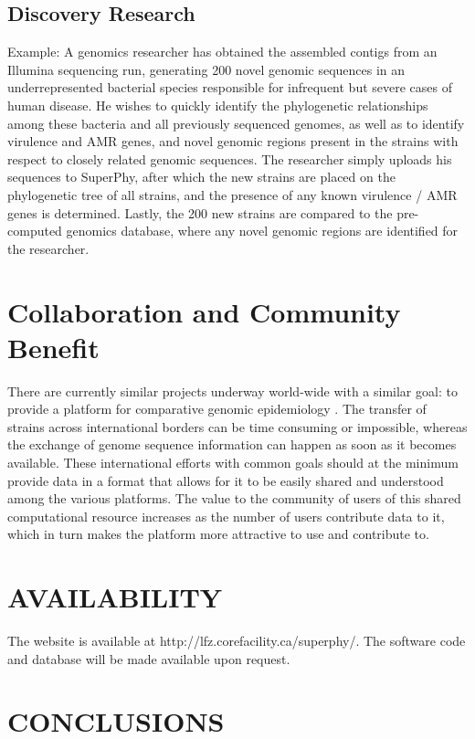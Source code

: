 \documentclass[a4paper,twoside]{article}
\begin{document}
\subsection{Discovery Research}
Example: A genomics researcher has obtained the assembled contigs from an Illumina sequencing run, generating 200 novel genomic sequences in an underrepresented bacterial species responsible for infrequent but severe cases of human disease. He wishes to quickly identify the phylogenetic relationships among these bacteria and all previously sequenced genomes, as well as to identify virulence and AMR genes, and novel genomic regions present in the strains with respect to closely related genomic sequences. The researcher simply uploads his sequences to SuperPhy, after which the new strains are placed on the phylogenetic tree of all strains, and the presence of any known virulence / AMR genes is determined. Lastly, the 200 new strains are compared to the pre-computed genomics database, where any novel genomic regions are identified for the researcher.

\section{Collaboration and Community Benefit}
\label{sec:collaboration}
There are currently similar projects underway world-wide with a similar goal: to provide a platform for comparative genomic epidemiology \cite{kupferschmidt_outbreak_2011}. The transfer of strains across international borders can be time consuming or impossible, whereas the exchange of genome sequence information can happen as soon as it becomes available. These international efforts with common goals should at the minimum provide data in a format that allows for it to be easily shared and understood among the various platforms. The value to the community of users of this shared computational resource increases as the number of users contribute data to it, which in turn makes the platform more attractive to use and contribute to.

\section{\uppercase{Availability}}
\label{sec:availability}

The website is available at http://lfz.corefacility.ca/superphy/. The software code and database will be made available upon request.

\section{\uppercase{Conclusions}}
\label{sec:conclusion}
\end{document}
